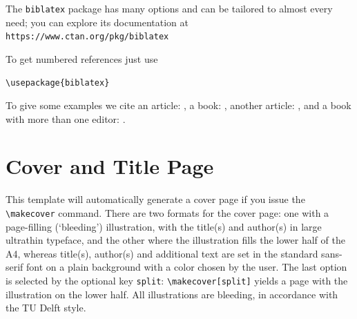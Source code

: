 The \texttt{biblatex} package has many options and can be tailored to almost
every need; you can explore its documentation at
\texttt{https://www.ctan.org/pkg/biblatex}

To get numbered references just use
\begin{verbatim}
\usepackage{biblatex}

\end{verbatim}

To give some examples we cite an article: \cite{Einstein1906},
a book: \cite{MR1039321}, another article: \cite{MR3860876},
and a book with more than one editor: \cite{MR3204729}.

\section{Cover and Title Page}

This template will automatically generate a cover page if you issue the \verb|\makecover| command. There are two formats for the cover page: one with a page-filling (`bleeding')
illustration, with the title(s) and author(s) in large ultrathin typeface, and the other where the illustration fills the lower half of the A4, whereas title(s), author(s) and additional
text are set in the standard sans-serif font on a plain background with a color chosen by the user. The last option is selected by the optional key \texttt{split}: \verb|\makecover[split]| yields
a page with the illustration on the lower half. All illustrations are bleeding, in accordance with the TU Delft style.

